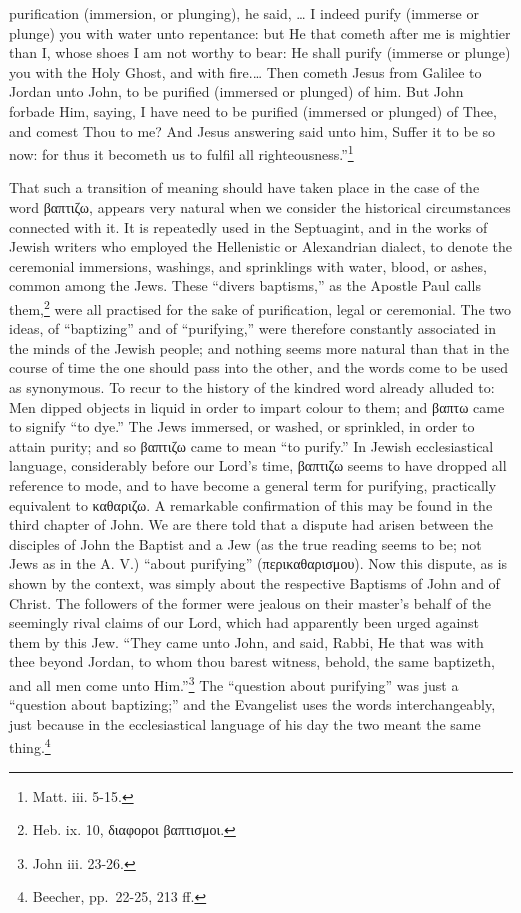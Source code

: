 \documentclass[]{book}
\begin{document}
purification (immersion, or plunging), he said, \ldots{} I indeed purify (immerse or plunge) you with water unto repentance: but He that cometh after me is mightier than I, whose shoes I am not worthy to bear: He shall purify (immerse or plunge) you with the Holy Ghost, and with fire.\ldots{} Then cometh Jesus from Galilee to Jordan unto John, to be purified (immersed or plunged) of him. But John forbade Him, saying, I have need to be purified (immersed or plunged) of Thee, and comest Thou to me? And Jesus answering said unto him, Suffer it to be so now: for thus it becometh us to fulfil all righteousness.''\footnote{Matt. iii. 5-15.}

That such a transition of meaning should have taken place in the case of the word βαπτιζω, appears very natural when we consider the historical circumstances connected with it. It is repeatedly used in the Septuagint, and in the works of Jewish writers who employed the Hellenistic or Alexandrian dialect, to denote the ceremonial immersions, washings, and sprinklings with water, blood, or ashes, common among the Jews. These ``divers baptisms,'' as the Apostle Paul calls them,\footnote{Heb. ix. 10, διαφοροι βαπτισμοι.} were all practised for the sake of purification, legal or ceremonial. The two ideas, of ``baptizing'' and of ``purifying,'' were therefore constantly associated in the minds of the Jewish people; and nothing seems more natural than that in the course of time the one should pass into the other, and the words come to be used as synonymous. To recur to the history of the kindred word already alluded to: Men dipped objects in liquid in order to impart colour to them; and βαπτω came to signify ``to dye.'' The Jews immersed, or washed, or sprinkled, in order to attain purity; and so βαπτιζω came to mean ``to purify.'' In Jewish ecclesiastical language, considerably before our Lord's time, βαπτιζω seems to have dropped all reference to mode, and to have become a general term for purifying, practically equivalent to καθαριζω. A remarkable confirmation of this may be found in the third chapter of John. We are there told that a dispute had arisen between the disciples of John the Baptist and a Jew (as the true reading seems to be; not Jews as in the A. V.) ``about purifying'' (περικαθαρισμου). Now this dispute, as is shown by the context, was simply about the respective Baptisms of John and of Christ. The followers of the former were jealous on their master's behalf of the seemingly rival claims of our Lord, which had apparently been urged against them by this Jew. ``They came unto John, and said, Rabbi, He that was with thee beyond Jordan, to whom thou barest witness, behold, the same baptizeth, and all men come unto Him.''\footnote{John iii. 23-26.} The ``question about purifying'' was just a ``question about baptizing;'' and the Evangelist uses the words interchangeably, just because in the ecclesiastical language of his day the two meant the same thing.\footnote{Beecher, pp.~22-25, 213 ff.}
\end{document}

